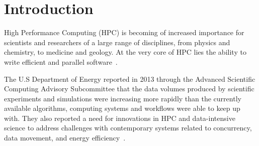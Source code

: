 \documentclass{uit-report}
\begin{document}
\newpage
\tableofcontents
\pagebreak
\listoffigures
\pagebreak
\listoftables
\lstlistoflistings
{}
\pagebreak

\pagestyle{empty}

\mbox{}

\newpage
{}
\pagestyle{secondstyle}
\setcounter{page}{1}



\chapter{Introduction}






High Performance Computing (HPC) is becoming of increased importance for scientists and researchers of a large range of disciplines, from physics and chemistry, to medicine and geology. At the very core of HPC lies the ability to write efficient and parallel software~\cite{engineering}.

The U.S Department of Energy reported in 2013 through the Advanced Scientific Computing Advisory Subcommittee that the data volumes produced by scientific experiments and simulations were increasing more rapidly than the currently available algorithms, computing systems and workflows were able to keep up with. They also reported a need for innovations in HPC and data-intensive science to address challenges with contemporary systems related to concurrency, data movement, and energy efficiency~\cite{subcommittee}.
\end{document}
